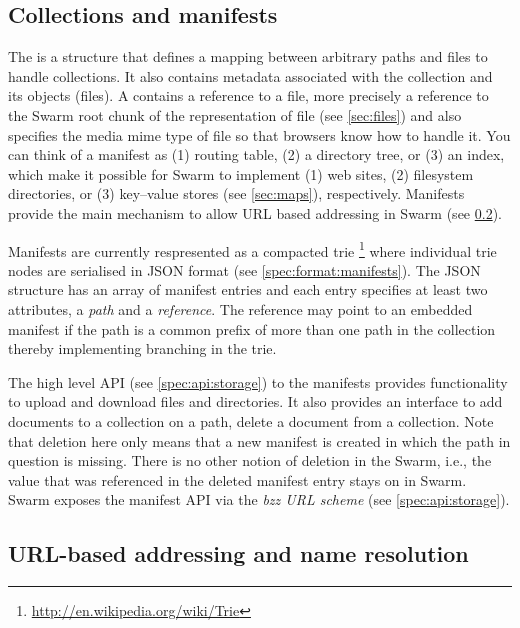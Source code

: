 \subsection{Collections and manifests}\label{sec:collections}

The  is a structure that defines a mapping between arbitrary paths and files to handle collections. It also contains metadata associated with the collection and its objects (files). A  contains a reference to a file, more precisely a reference to the Swarm root chunk of the representation of file (see \ref{sec:files}) and also specifies the media mime type of file so that browsers know how to handle it. You can think of a manifest as (1) routing table, (2) a directory tree, or  (3) an index, which make it possible for Swarm to implement (1) web sites, (2) filesystem directories, or (3) key--value stores (see \ref{sec:maps}), respectively. Manifests provide the main mechanism to allow URL based addressing in Swarm (see \ref{sec:urls}). 

Manifests are currently respresented as a compacted trie%
\footnote{\url{http://en.wikipedia.org/wiki/Trie}}
%
where individual trie nodes are serialised in JSON format (see \ref{spec:format:manifests}). The JSON structure has an array of manifest entries and each entry specifies at least two attributes, a \emph{path} and a \emph{reference}. The reference may point to an embedded manifest if the path is a common prefix of more than one path in the collection thereby implementing branching in the trie. 

The high level API (see \ref{spec:api:storage}) to the manifests provides functionality to upload and download  files and directories. It also provides an interface to add documents to a collection on a path, delete a document from a collection. Note that deletion here only means that a new manifest is created in which the path in question is missing. There is no other notion of deletion in the Swarm, i.e., the value that was referenced in the deleted manifest entry stays on in Swarm. Swarm exposes the manifest API via the \emph{bzz URL scheme} (see \ref{spec:api:storage}).

\subsection{URL-based addressing and name resolution}\label{sec:urls}

